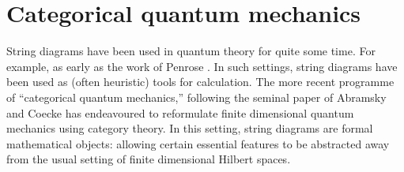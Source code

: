 


\section{Categorical quantum mechanics}
\label{sec:cqm}
%
%
%
%
%
%
%
%
%
%
%



String diagrams have been used in quantum theory for quite some time.  For example, as early as the work of Penrose \cite{penrosei}.  In such settings, string diagrams have been used as (often heuristic) tools for calculation. The more recent programme of ``categorical quantum mechanics,'' following the seminal paper of Abramsky and Coecke \cite{abramsky} has endeavoured to reformulate finite dimensional quantum mechanics using category theory.  In this setting,  string diagrams are formal mathematical objects: allowing certain essential features to be abstracted away from the usual setting of finite dimensional Hilbert spaces.

